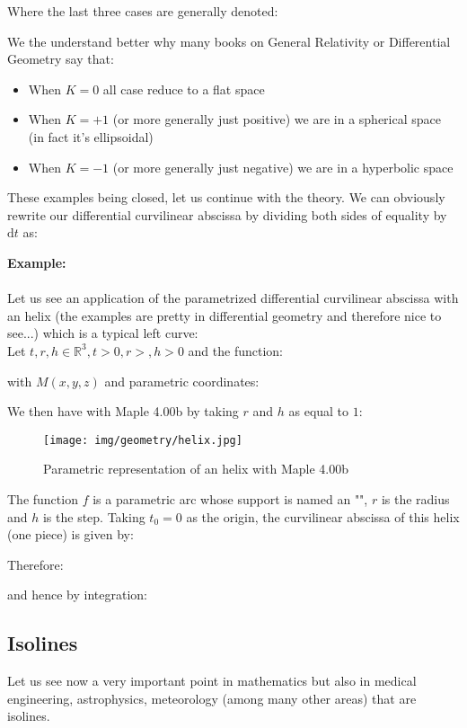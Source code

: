 {	Where the last three cases are generally denoted:
	
	We the understand better why many books on General Relativity or Differential Geometry say that:
	\begin{itemize}
		\item When $K=0$ all case reduce to a flat space
		
		\item When $K=+1$ (or more generally just positive) we are in a spherical space (in fact it's ellipsoidal)
		
		\item When $K=-1$ (or more generally just negative) we are in a hyperbolic space
	\end{itemize}
	These examples being closed, let us continue with the theory. We can obviously rewrite our differential curvilinear abscissa by dividing both sides of equality by $\mathrm{d}t$ as:
	
	\begin{tcolorbox}[colframe=black,colback=white,sharp corners]
	\textbf{{\Large {}}Example:}\\\\
	\label{curvilinear abscissa helix}Let us see an application of the parametrized differential curvilinear abscissa with an helix (the examples are pretty in differential geometry and therefore nice to see...) which is a typical left curve:\\
	
	Let $t,r,h\in \mathbb{R}^3,t>0,r>,h>0$ and the function:
	
	with $M(x,y,z)$ and parametric coordinates:
	
	We then have with Maple 4.00b by taking $r$ and $h$ as equal to $1$:
	\begin{figure}[H]
		\centering
		\texttt{[image: img/geometry/helix.jpg]}
		\caption{Parametric representation of an helix with Maple 4.00b}
	\end{figure}
	The function $f$ is a parametric arc whose support is named an "", $r$ is the radius and $h$ is the step. Taking $t_0=0$ as the origin, the curvilinear abscissa of this helix (one piece) is given by:
	
	Therefore:
	
	and hence by integration:
	
	\end{tcolorbox}
	
	\subsection{Isolines}\label{isoline}
	Let us see now  a very important point in mathematics but also in medical engineering, astrophysics, meteorology (among many other areas) that are isolines.
	
}
